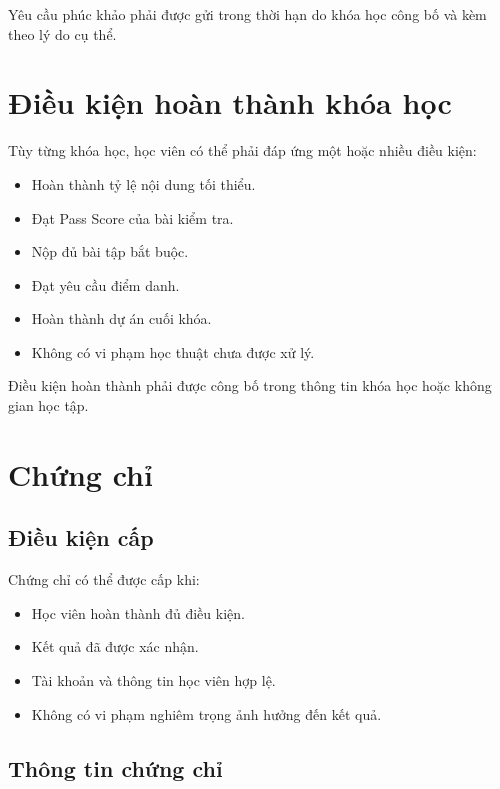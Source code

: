 \documentclass[12pt,a4paper]{article}
\begin{document}
Yêu cầu phúc khảo phải được gửi trong thời hạn do khóa học công bố
và kèm theo lý do cụ thể.

\section{Điều kiện hoàn thành khóa học}

Tùy từng khóa học, học viên có thể phải đáp ứng một hoặc nhiều điều kiện:

\begin{itemize}
    \item Hoàn thành tỷ lệ nội dung tối thiểu.
    \item Đạt Pass Score của bài kiểm tra.
    \item Nộp đủ bài tập bắt buộc.
    \item Đạt yêu cầu điểm danh.
    \item Hoàn thành dự án cuối khóa.
    \item Không có vi phạm học thuật chưa được xử lý.
\end{itemize}

Điều kiện hoàn thành phải được công bố trong thông tin khóa học
hoặc không gian học tập.

\section{Chứng chỉ}

\subsection{Điều kiện cấp}

Chứng chỉ có thể được cấp khi:

\begin{itemize}
    \item Học viên hoàn thành đủ điều kiện.
    \item Kết quả đã được xác nhận.
    \item Tài khoản và thông tin học viên hợp lệ.
    \item Không có vi phạm nghiêm trọng ảnh hưởng đến kết quả.
\end{itemize}

\subsection{Thông tin chứng chỉ}
\end{document}
